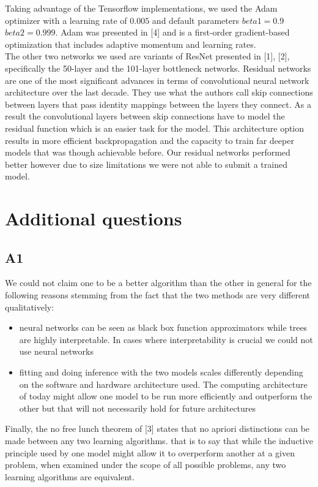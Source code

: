 \documentclass[12pt,twoside]{article}
\begin{document}
Taking advantage of the Tensorflow implementations, we used the Adam optimizer with a learning rate of $0.005$ and default parameters $beta1=0.9$ $beta2=0.999$. Adam was presented in [4] and is a first-order gradient-based optimization that includes adaptive momentum and learning rates. \\


The other two networks we used are variants of ResNet presented in [1], [2], specifically the 50-layer and the 101-layer bottleneck networks. Residual networks are one of the most significant advances in terms of convolutional neural network architecture over the last decade. They use what the authors call skip connections between layers that pass identity mappings between the layers they connect. As a result the convolutional layers between skip connections have to model the residual function which is an easier task for the model. This architecture option results in more efficient backpropagation and the capacity to train far deeper models that was though achievable before. Our residual networks performed better however due to size limitations we were not able to submit a trained model.

\section{Additional questions}

\subsection{A1}
We could not claim one to be a better algorithm than the other in general for the following reasons stemming from the fact that the two methods are very different qualitatively:
\begin{itemize}
\item neural networks can be seen as black box function approximators while trees are highly interpretable. In cases where interpretability is crucial we could not use neural networks
\item fitting and doing inference with the two models scales differently depending on the software and hardware architecture used. The computing architecture of today might allow one model to be run more efficiently and outperform the other but that will not necessarily hold for future architectures
\end{itemize}
Finally, the no free lunch theorem of [3] states that no apriori distinctions can be made between any two learning algorithms. that is to say that while the inductive principle used by one model might allow it to overperform another at a given problem, when examined under the scope of all possible problems, any two learning algorithms are equivalent.
\end{document}
